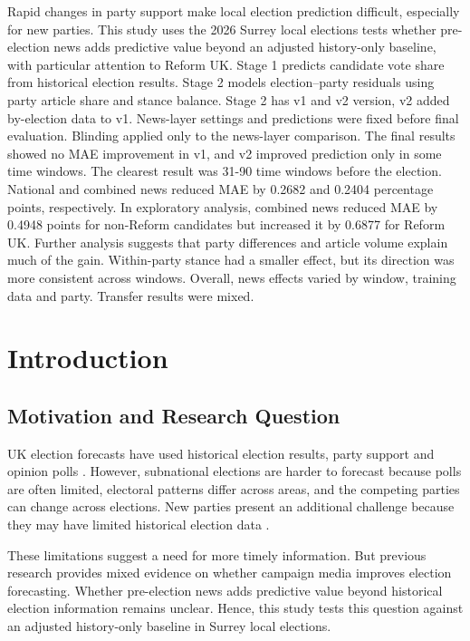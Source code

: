\documentclass[final-report]{report-template}
\begin{document}
Rapid changes in party support make local election prediction difficult, especially for new parties. This study uses the 2026 Surrey local elections tests whether pre-election news adds predictive value beyond an adjusted history-only baseline, with particular attention to Reform UK. Stage 1 predicts candidate vote share from historical election results. Stage 2 models election–party residuals using party article share and stance balance. Stage 2 has v1 and v2 version, v2 added by-election data to v1. News-layer settings and predictions were fixed before final evaluation. Blinding applied only to the news-layer comparison. The final results showed no MAE improvement in v1, and v2 improved prediction only in some time windows. The clearest result was 31-90 time windows before the election. National and combined news reduced MAE by 0.2682 and 0.2404 percentage points, respectively. In exploratory analysis, combined news reduced MAE by 0.4948 points for non-Reform candidates but increased it by 0.6877 for Reform UK. Further analysis suggests that party differences and article volume explain much of the gain. Within-party stance had a smaller effect, but its direction was more consistent across windows. Overall, news effects varied by window, training data and party. Transfer results were mixed.


\section{Introduction}

\subsection{Motivation and Research Question}

UK election forecasts have used historical election results, party support and opinion polls \parencite{STEGMAIER2023102694}. However, subnational elections are harder to forecast because polls are often limited, electoral patterns differ across areas, and the competing parties can change across elections\parencite{STOETZER2025102939}. New parties present an additional challenge because they may have limited historical election data \parencite{MONTALVO201952}.

These limitations suggest a need for more timely information. But previous research provides mixed evidence on whether campaign media improves election forecasting\parencite{BELANGER2012702,UMEDA2023956}. Whether pre-election news adds predictive value beyond historical election information remains unclear. Hence, this study tests this question against an adjusted history-only baseline in Surrey local elections.
\end{document}
